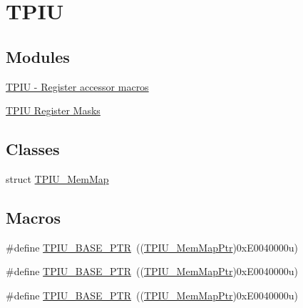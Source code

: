 \hypertarget{group___t_p_i_u___peripheral}{}\section{T\+P\+IU}
\label{group___t_p_i_u___peripheral}
\subsection*{Modules}
\begin{DoxyCompactItemize}
\item 
\hyperlink{group___t_p_i_u___register___accessor___macros}{T\+P\+I\+U -\/ Register accessor macros}
\item 
\hyperlink{group___t_p_i_u___register___masks}{T\+P\+I\+U Register Masks}
\end{DoxyCompactItemize}
\subsection*{Classes}
\begin{DoxyCompactItemize}
\item 
struct \hyperlink{struct_t_p_i_u___mem_map}{T\+P\+I\+U\+\_\+\+Mem\+Map}
\end{DoxyCompactItemize}
\subsection*{Macros}
\begin{DoxyCompactItemize}
\item 
\#define \hyperlink{group___t_p_i_u___peripheral_ga9294dc3ec1881014ac83408db60de6a0}{T\+P\+I\+U\+\_\+\+B\+A\+S\+E\+\_\+\+P\+TR}~((\hyperlink{group___t_p_i_u___peripheral_ga300f3eea21a542970734e2c9c0953f4f}{T\+P\+I\+U\+\_\+\+Mem\+Map\+Ptr})0x\+E0040000u)
\item 
\#define \hyperlink{group___t_p_i_u___peripheral_ga9294dc3ec1881014ac83408db60de6a0}{T\+P\+I\+U\+\_\+\+B\+A\+S\+E\+\_\+\+P\+TR}~((\hyperlink{group___t_p_i_u___peripheral_ga300f3eea21a542970734e2c9c0953f4f}{T\+P\+I\+U\+\_\+\+Mem\+Map\+Ptr})0x\+E0040000u)
\item 
\#define \hyperlink{group___t_p_i_u___peripheral_ga9294dc3ec1881014ac83408db60de6a0}{T\+P\+I\+U\+\_\+\+B\+A\+S\+E\+\_\+\+P\+TR}~((\hyperlink{group___t_p_i_u___peripheral_ga300f3eea21a542970734e2c9c0953f4f}{T\+P\+I\+U\+\_\+\+Mem\+Map\+Ptr})0x\+E0040000u)
\end{DoxyCompactItemize}

